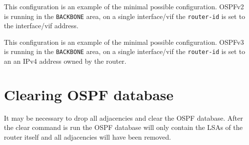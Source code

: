 This configuration is an example of the minimal possible
configuration. OSPFv2 is running in the {\tt BACKBONE} area, on a single
interface/vif the {\tt router-id} is set to the interface/vif address.

\vspace{0.1in}
\noindent{}

This configuration is an example of the minimal possible
configuration. OSPFv3 is running in the {\tt BACKBONE} area, on a single
interface/vif the {\tt router-id} is set to an an IPv4 address owned
by the router.

\newpage
\section{Clearing OSPF database}

It may be necessary to drop all adjacencies and clear the OSPF
database. After the clear command is run the OSPF database will only
contain the LSAs of the router itself and all adjacencies will have been
removed.

\vspace{0.1in}
\noindent{}

